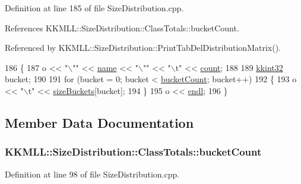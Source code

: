Definition at line 185 of file Size\+Distribution.\+cpp.



References K\+K\+M\+L\+L\+::\+Size\+Distribution\+::\+Class\+Totals\+::bucket\+Count.



Referenced by K\+K\+M\+L\+L\+::\+Size\+Distribution\+::\+Print\+Tab\+Del\+Distribution\+Matrix().


\begin{DoxyCode}
186 \{
187   o << \textcolor{stringliteral}{"\(\backslash\)""} << \hyperlink{class_size_distribution_1_1_class_totals_a7653b3388a786c26c3ece3f5f92aabec}{name} << \textcolor{stringliteral}{"\(\backslash\)""} << \textcolor{stringliteral}{"\(\backslash\)t"} << \hyperlink{class_size_distribution_1_1_class_totals_a0b48bda46c5e908b4ab5511293837f3c}{count};
188 
189   \hyperlink{namespace_k_k_b_a8fa4952cc84fda1de4bec1fbdd8d5b1b}{kkint32}  bucket;
190 
191   \textcolor{keywordflow}{for} (bucket = 0;  bucket <  \hyperlink{class_size_distribution_1_1_class_totals_a207977a949ae5a9a96aa7b6a6ed999a6}{bucketCount}; bucket++)
192   \{
193     o << \textcolor{stringliteral}{"\(\backslash\)t"} << \hyperlink{class_size_distribution_1_1_class_totals_a61245bf9b17ab9b90d989ab4f8dd2fea}{sizeBuckets}[bucket];
194   \}
195   o << \hyperlink{namespace_k_k_b_ad1f50f65af6adc8fa9e6f62d007818a8}{endl};
196 \}
\end{DoxyCode}


\subsection{Member Data Documentation}
\subsubsection[{\texorpdfstring{bucket\+Count}{bucketCount}}]{ K\+K\+M\+L\+L\+::\+Size\+Distribution\+::\+Class\+Totals\+::bucket\+Count}\hypertarget{class_size_distribution_1_1_class_totals_a207977a949ae5a9a96aa7b6a6ed999a6}{}\label{class_size_distribution_1_1_class_totals_a207977a949ae5a9a96aa7b6a6ed999a6}


Definition at line 98 of file Size\+Distribution.\+cpp.



